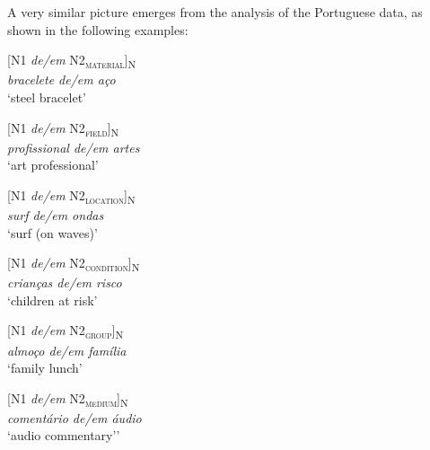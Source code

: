\documentclass[output=paper]{langsci/langscibook}
\begin{document}
A very similar picture emerges from the analysis of the Portuguese data, as shown in the following examples:

\begin{exe}\ex\begin{minipage}[t]{0.4\textwidth}    %
[N1 \textit{de/em} N2\textsubscript{\scshape material}]\textsubscript{N}\\
\textit{bracelete de/em aço}\\
`steel bracelet'
\end{minipage}\hfill%
\begin{minipage}[t]{0.45\textwidth}
[N1 \textit{de/em} N2\textsubscript{\scshape field}]\textsubscript{N}\\
\textit{profissional de/em artes}\\
`art professional'
\end{minipage}
\end{exe}

\begin{exe}\ex\begin{minipage}[t]{0.4\textwidth}    %
[N1 \textit{de/em} N2\textsubscript{\scshape location}]\textsubscript{N}\\
\textit{surf de/em ondas }\\
`surf (on waves)'
\end{minipage}\hfill            %
\begin{minipage}[t]{0.45\textwidth}
[N1 \textit{de/em} N2\textsubscript{\scshape condition}]\textsubscript{N}\\
\textit{crianças de/em risco}\\
`children at risk'
\end{minipage}\end{exe}

\begin{exe}\ex\begin{minipage}[t]{0.4\textwidth}    %
[N1 \textit{de/em} N2\textsubscript{\scshape group}]\textsubscript{N}\\
\textit{almoço de/em família}\\
`family lunch'
\end{minipage}\hfill%
\begin{minipage}[t]{0.45\textwidth}
[N1 \textit{de/em} N2\textsubscript{\scshape medium}]\textsubscript{N}\\
\textit{comentário de/em áudio}\\
`audio commentary’'
\end{minipage}\end{exe}
\end{document}

